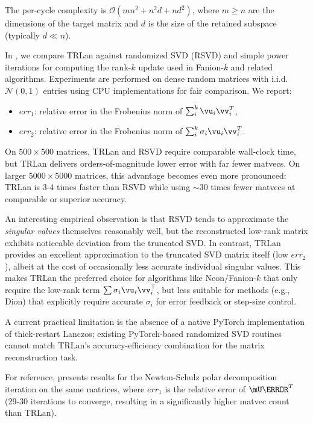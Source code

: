 \documentclass[pmlr]{jmlr}%
\begin{document}
 The per-cycle complexity is $\mathcal{O}(mn^2 + n^2d + nd^2)$, where $m \geq n$ are the dimensions of the target matrix and $d$ is the size of the retained subspace (typically $d \ll n$).
 
 In , we compare TRLan against randomized SVD (RSVD) and simple power iterations for computing the rank-$k$ update used in Fanion-$k$ and related algorithms. Experiments are performed on dense random matrices with i.i.d. $\mathcal{N}(0,1)$ entries using CPU implementations for fair comparison.
 We report:
 \begin{itemize}
   \item $err_1$: relative error in the Frobenius norm of $\sum_i^k \vu_i \vv_i^T$,
   \item $err_2$: relative error in the Frobenius norm of $\sum_i^k \sigma_i \vu_i \vv_i^T$.
 \end{itemize}
 
 On $500\times500$ matrices, TRLan and RSVD require comparable wall-clock time, but TRLan delivers orders-of-magnitude lower error with far fewer matvecs. On larger $5000\times5000$ matrices, this advantage becomes even more pronounced: TRLan is 3-4 times faster than RSVD while using $\sim$30 times fewer matvecs at comparable or superior accuracy.
 
 An interesting empirical observation is that RSVD tends to approximate the \emph{singular values} themselves reasonably well, but the reconstructed low-rank matrix exhibits noticeable deviation from the truncated SVD. In contrast, TRLan provides an excellent approximation to the truncated SVD matrix itself (low $err_2$), albeit at the cost of occasionally less accurate individual singular values. This makes TRLan the preferred choice for algorithms like Neon/Fanion-$k$ that only require the low-rank term $\sum \sigma_i \vu_i \vv_i^\top$, but less suitable for methods (e.g., Dion) that explicitly require accurate $\sigma_i$ for error feedback or step-size control.
 
 A current practical limitation is the absence of a native PyTorch implementation of thick-restart Lanczos; existing PyTorch-based randomized SVD routines cannot match TRLan's accuracy-efficiency combination for the matrix reconstruction task.
 
 For reference,  presents results for the Newton-Schulz polar decomposition iteration on the same matrices, where $err_1$ is the relative error of $\mU\mV^T$ (29-30 iterations to converge, resulting in a significantly higher matvec count than TRLan).
 
\end{document}
